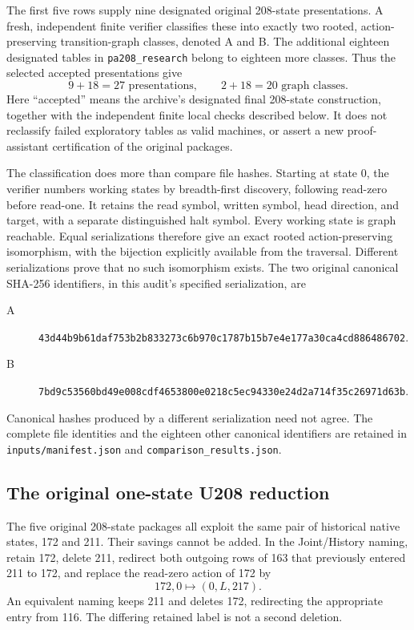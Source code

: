 The first five rows supply nine designated original 208-state presentations.
A fresh, independent finite verifier classifies these into exactly two rooted,
action-preserving transition-graph classes, denoted A and B.  The additional
eighteen designated tables in \texttt{pa208\_research} belong to eighteen more
classes.  Thus the selected accepted presentations give
\[
  9+18=27\text{ presentations},\qquad 2+18=20\text{ graph classes}.
\]
Here ``accepted'' means the archive's designated final 208-state
construction, together with the independent finite local checks described
below.  It does not reclassify failed exploratory tables as valid machines,
or assert a new proof-assistant certification of the original packages.

The classification does more than compare file hashes.  Starting at state 0,
the verifier numbers working states by breadth-first discovery, following
read-zero before read-one.  It retains the read symbol, written symbol,
head direction, and target, with a separate distinguished halt symbol.
Every working state is graph reachable.  Equal serializations therefore give
an exact rooted action-preserving isomorphism, with the bijection explicitly
available from the traversal.  Different serializations prove that no such
isomorphism exists.  The two original canonical SHA-256 identifiers, in this
audit's specified serialization, are
\begin{description}
\item[A]
\nolinkurl{43d44b9b61daf753b2b833273c6b970c1787b15b7e4e177a30ca4cd886486702}.
\item[B]
\nolinkurl{7bd9c53560bd49e008cdf4653800e0218c5ec94330e24d2a714f35c26971d63b}.
\end{description}
Canonical hashes produced by a different serialization need not agree.
The complete file identities and the eighteen other canonical identifiers
are retained in \texttt{inputs/manifest.json} and
\texttt{comparison\_results.json}.

\subsection{The original one-state U208 reduction}
The five original 208-state packages all exploit the same pair of historical
native states, 172 and 211.  Their savings cannot be added.  In the
Joint/History naming, retain 172, delete 211, redirect both outgoing rows of
163 that previously entered 211 to 172, and replace the read-zero action of
172 by
\[
               172,0\longmapsto(0,L,217).
\]
An equivalent naming keeps 211 and deletes 172, redirecting the appropriate
entry from 116.  The differing retained label is not a second deletion.

